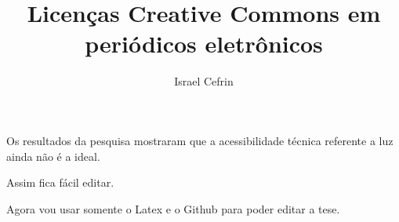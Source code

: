 \documentclass[11pt, oneside]{article}   	%
\title{Licenças Creative Commons em periódicos eletrônicos}
\author{Israel Cefrin}
\date{\displaydate{date}}
\begin{document}
\maketitle

Os resultados da pesquisa mostraram que a acessibilidade técnica referente a luz ainda não é a ideal.

Assim fica fácil editar.

Agora vou usar somente o Latex e o Github para poder editar a tese.
\end{document}
